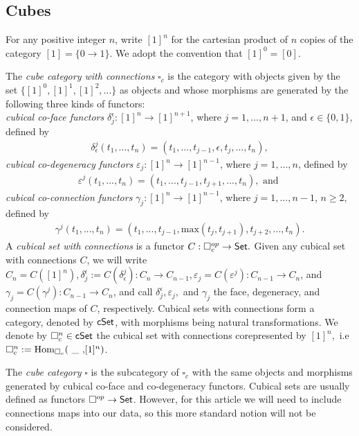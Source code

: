 
\subsection{Cubes}

For any positive integer $n$, write $[1]^n$ for the cartesian product of $n$ copies of the category $[1]=\{0 \to 1\}$. We adopt the convention that $[1]^0=[0]$. 

The \textit{cube category with connections} $\square_c$ is the category with objects given by the set $\{[1]^0, [1]^1, [1]^2,...\}$ as objects and whose morphisms are generated by the following three kinds of functors:
\\
\textit{cubical co-face functors} $\delta^{\epsilon}_{j}: [1]^n \to [1]^{n+1}$, where $j=1,...,n+1$, and $\epsilon \in \{0,1\}$, defined by
\begin{eqnarray*}
\delta^{j}_{\epsilon}(t_1,...,t_n)=(t_1,...,t_{j-1},\epsilon,t_j,...,t_n),
\end{eqnarray*}
\textit{cubical co-degeneracy functors} $\varepsilon_{j}: [1]^n \to [1]^{n-1}$, where $j=1,...,n$, defined by
\begin{eqnarray*}
\varepsilon^{j}(t_1,...,t_n)=(t_1,...,t_{j-1},t_{j+1},...,t_n), \text{ and }
\end{eqnarray*}
\textit{cubical co-connection functors} $\gamma_{j}: [1]^n \to [1]^{n-1}$, where $j=1,...,n-1$, $n\geq 2$, defined by
\begin{eqnarray*}
\gamma^{j}(t_1,...,t_n)=(t_1,...,t_{j-1},\text{max}(t_j,t_{j+1}),t_{j+2},...,t_n).
\end{eqnarray*}
A \textit{cubical set with connections} is a functor $C: \square_c^{op} \to \mathsf{Set}.$ Given any cubical set with connections $C$, we will write $C_n= C( [1]^n ), \delta^{\epsilon}_j := C( \delta^{j}_{\epsilon}): C_n \to C_{n-1}, \varepsilon_j=C(\varepsilon^j): C_{n-1} \to C_n$, and $\gamma_j=C(\gamma^j): C_{n-1} \to C_n$, and call $\delta^{\epsilon}_j, \varepsilon_j,$ and $\gamma_j$ the face, degeneracy, and connection maps of $C$, respectively. Cubical sets with connections form a category, denoted by $\mathsf{cSet}$, with morphisms being natural transformations. We denote by $\square_c^n \in \mathsf{cSet}$ the cubical set with connections corepresented by $[1]^n,$ i.e $\square_c^n:= \mathrm{Hom}_{\square_c}(\text{ \_ ,}[1]^n)$. 

\begin{remark} The \textit{cube category} $\square$ is the subcategory of $\square_c$ with the same objects and morphisms generated by cubical co-face and co-degeneracy functors. Cubical sets are usually defined as functors $\square^{op} \to \mathsf{Set}$. However, for this article we will need to include connections maps into our data, so this more standard notion will not be considered. 
\end{remark}




